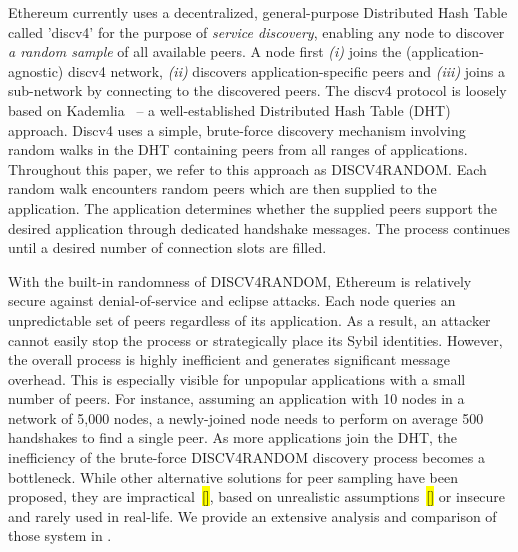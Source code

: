  Ethereum currently uses a decentralized, general-purpose Distributed Hash Table called 'discv4' for the purpose of \textit{service discovery}, enabling any node to discover \textit{a random sample} of all available peers. A node first \textit{(i)} joins the (application-agnostic) discv4 network, \textit{(ii)} discovers application-specific peers and \textit{(iii)} joins a sub-network by connecting to the discovered peers. The discv4 protocol is loosely based on Kademlia~\cite{maymounkov2002kademlia} – a well-established Distributed Hash Table (DHT) approach. Discv4 uses a simple, brute-force discovery mechanism involving random walks in the DHT containing peers from all ranges of applications. Throughout this paper, we refer to this approach as DISCV4RANDOM. Each random walk encounters random peers which are then supplied to the application. The application determines whether the supplied peers support the desired application through dedicated handshake messages. The process continues until a desired number of connection slots are filled. 

With the built-in randomness of DISCV4RANDOM, Ethereum is relatively secure against denial-of-service and eclipse attacks. Each node queries an unpredictable set of peers regardless of its application. As a result, an attacker cannot easily stop the process or strategically place its Sybil identities.
However, the overall process is highly inefficient and generates significant message overhead. This is especially visible for unpopular applications with a small number of peers.  For instance, assuming an application with 10 nodes in a network of 5,000 nodes, a newly-joined node needs to perform on average 500 handshakes to find a single peer. As more applications join the DHT, the inefficiency of the brute-force DISCV4RANDOM discovery process becomes a bottleneck. While other alternative solutions for peer sampling have been proposed, they are impractical~\hl{[]}, based on unrealistic assumptions~\hl{[]} or insecure and rarely used in real-life. We provide an extensive analysis and comparison of those system in .



